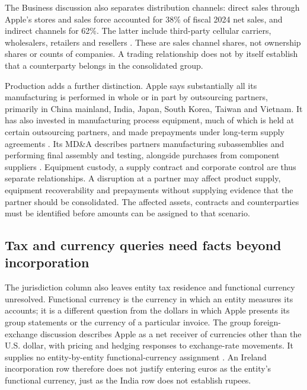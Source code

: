 The Business discussion also separates distribution channels: direct sales
through Apple's stores and sales force accounted for 38\% of fiscal 2024 net
sales, and indirect channels for 62\%. The latter include third-party cellular
carriers, wholesalers, retailers and resellers
\citep[Markets and Distribution, printed p.~2]{apple2024}. These are sales
channel shares, not ownership shares or counts of companies. A trading
relationship does not by itself establish that a counterparty belongs in the
consolidated group.

Production adds a further distinction. Apple says substantially all its
manufacturing is performed in whole or in part by outsourcing partners,
primarily in China mainland, India, Japan, South Korea, Taiwan and Vietnam.
It has also invested in manufacturing process equipment, much of which is
held at certain outsourcing partners, and made prepayments under long-term
supply agreements \citep[Risk Factors, printed p.~8]{apple2024}. Its MD\&A
describes partners manufacturing subassemblies and performing final assembly
and testing, alongside purchases from component suppliers
\citep[Manufacturing Purchase Obligations, printed p.~25]{apple2024}.
Equipment custody, a supply contract and corporate control are thus separate
relationships. A disruption at a partner may affect product supply, equipment
recoverability and prepayments without supplying evidence that the partner
should be consolidated. The affected assets, contracts and counterparties
must be identified before amounts can be assigned to that scenario.

\subsection{Tax and currency queries need facts beyond incorporation}

The jurisdiction column also leaves entity tax residence and functional
currency unresolved. Functional currency is the currency in which an entity
measures its accounts; it is a different question from the dollars in which
Apple presents its group statements or the currency of a particular invoice.
The group foreign-exchange discussion describes Apple as a net receiver of
currencies other than the U.S. dollar, with pricing and hedging responses to
exchange-rate movements. It supplies no entity-by-entity functional-currency
assignment \citep[Foreign Exchange Rate Risk, printed p.~27]{apple2024}.
An Ireland incorporation row therefore does not justify entering euros as the
entity's functional currency, just as the India row does not establish rupees.

